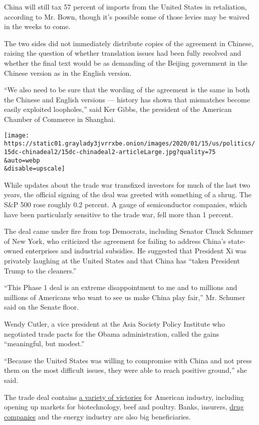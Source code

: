 China will still tax 57 percent of imports from the United States in
retaliation, according to Mr. Bown, though it's possible some of those
levies may be waived in the weeks to come.

The two sides did not immediately distribute copies of the agreement in
Chinese, raising the question of whether translation issues had been
fully resolved and whether the final text would be as demanding of the
Beijing government in the Chinese version as in the English version.

``We also need to be sure that the wording of the agreement is the same
in both the Chinese and English versions --- history has shown that
mismatches become easily exploited loopholes,'' said Ker Gibbs, the
president of the American Chamber of Commerce in Shanghai.

\texttt{[image: https://static01.graylady3jvrrxbe.onion/images/2020/01/15/us/politics/15dc-chinadeal2/15dc-chinadeal2-articleLarge.jpg?quality=75\\\&auto=webp\\\&disable=upscale]}

While updates about the trade war transfixed investors for much of the
last two years, the official signing of the deal was greeted with
something of a shrug. The S\&P 500 rose roughly 0.2 percent. A gauge of
semiconductor companies, which have been particularly sensitive to the
trade war, fell more than 1 percent.

The deal came under fire from top Democrats, including Senator Chuck
Schumer of New York, who criticized the agreement for failing to address
China's state-owned enterprises and industrial subsidies. He suggested
that President Xi was privately laughing at the United States and that
China has ``taken President Trump to the cleaners.''

``This Phase 1 deal is an extreme disappointment to me and to millions
and millions of Americans who want to see us make China play fair,'' Mr.
Schumer said on the Senate floor.

Wendy Cutler, a vice president at the Asia Society Policy Institute who
negotiated trade pacts for the Obama administration, called the gains
``meaningful, but modest.''

``Because the United States was willing to compromise with China and not
press them on the most difficult issues, they were able to reach
positive ground,'' she said.

The trade deal contains
\href{https://www.nytimes3xbfgragh.onion/2020/01/14/business/economy/trump-china-trade-deal.html}{a
variety of victories} for American industry, including opening up
markets for biotechnology, beef and poultry. Banks, insurers,
\href{https://www.nytimes3xbfgragh.onion/2019/08/27/business/china-cheap-drug-imports.html}{drug
companies} and the energy industry are also big beneficiaries.

